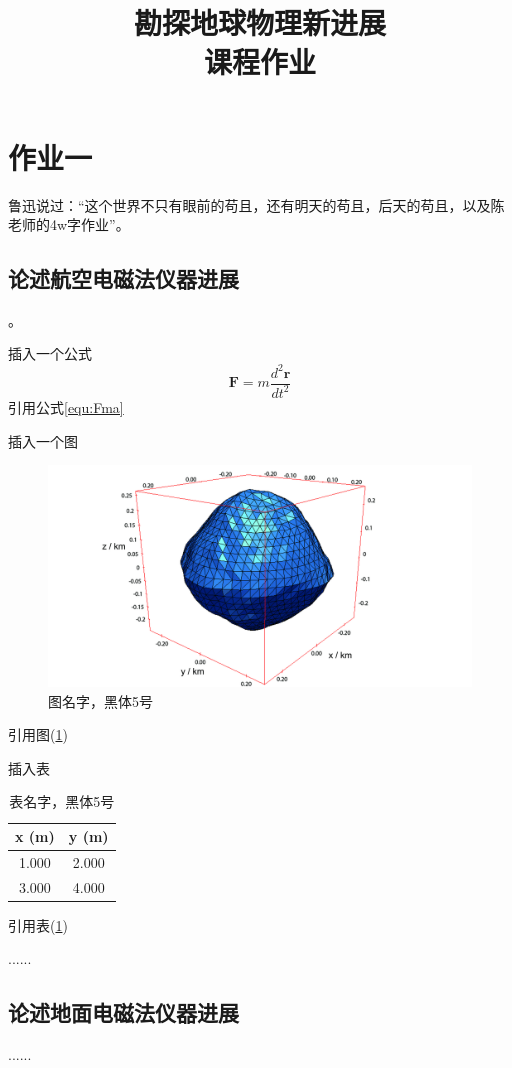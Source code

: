 \documentclass{coursework}
\title{勘探地球物理新进展\\课程作业}%
\begin{document}
	\maketitle	
	\section{作业一}
	鲁迅说过：“这个世界不只有眼前的苟且，还有明天的苟且，后天的苟且，以及陈老师的4w字作业”\citep{luxun}。
	\subsection{论述航空电磁法仪器进展}
	\citep{Fountain1998,AUKEN201747}。
	
	
	插入一个公式
	\begin{equation}\label{equ:Fma}
	\mathbf{F}=m\frac{d^2\mathbf{r}}{dt^2}
	\end{equation}
	引用公式\eqref{equ:Fma}
	
	插入一个图
	\begin{figure}[H]
		\centering
		\includegraphics[width=0.8\linewidth]{fig/1.jpg}
		\caption{图名字，黑体5号}\label{fig:1}
	\end{figure}
	引用图(\ref{fig:1})

	插入表
	\begin{table}[H]
		\centering
		\caption{表名字，黑体5号}\label{tab:1}
		\begin{tabular}{cc}
			\toprule
			x (m)&y (m)  \\ 
			\midrule 
			1.000&2.000  \\ 
			\hline 
			3.000&4.000  \\ 
			\bottomrule
		\end{tabular} 
	\end{table}
	引用表(\ref{tab:1})	
	
	......
	\subsection{论述地面电磁法仪器进展}
	......
\end{document}
